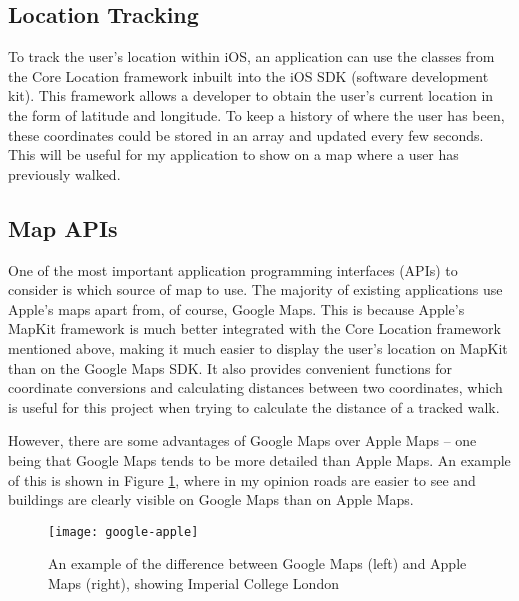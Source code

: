 \subsection{Location Tracking}

To track the user's location within iOS, an application can use the classes from the Core Location framework \cite{AppleInc.} inbuilt into the iOS SDK (software development kit). This framework allows a developer to obtain the user's current location in the form of latitude and longitude. To keep a history of where the user has been, these coordinates could be stored in an array and updated every few seconds. This will be useful for my application to show on a map where a user has previously walked.


\subsection{Map APIs} \label{subsection:background-apis}

One of the most important application programming interfaces (APIs) to consider is which source of map to use. The majority of existing applications use Apple's maps apart from, of course, Google Maps. This is because Apple's MapKit framework \cite{AppleInc.a} is much better integrated with the Core Location framework mentioned above, making it much easier to display the user's location on MapKit than on the Google Maps SDK. It also provides convenient functions for coordinate conversions and calculating distances between two coordinates, which is useful for this project when trying to calculate the distance of a tracked walk.

However, there are some advantages of Google Maps over Apple Maps -- one being that Google Maps tends to be more detailed than Apple Maps. An example of this is shown in Figure \ref{fig:google-apple}, where in my opinion roads are easier to see and buildings are clearly visible on Google Maps than on Apple Maps.

\begin{figure}[hbt]
  \centering
  \texttt{[image: google-apple]}
  \caption{An example of the difference between Google Maps (left) and Apple Maps (right), showing Imperial College London}
  \label{fig:google-apple}
\end{figure}


